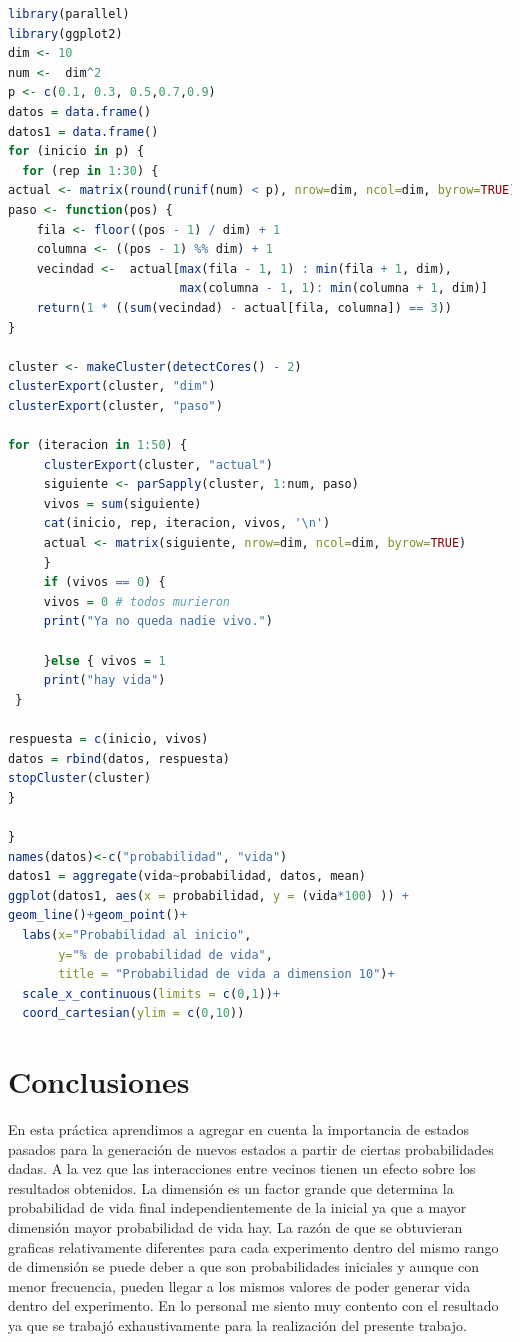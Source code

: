 \documentclass{article}
\begin{document}
\begin{lstlisting}[language=R]
library(parallel)
library(ggplot2)
dim <- 10
num <-  dim^2
p <- c(0.1, 0.3, 0.5,0.7,0.9)
datos = data.frame()
datos1 = data.frame()
for (inicio in p) {
  for (rep in 1:30) {
actual <- matrix(round(runif(num) < p), nrow=dim, ncol=dim, byrow=TRUE)
paso <- function(pos) {
    fila <- floor((pos - 1) / dim) + 1
    columna <- ((pos - 1) %% dim) + 1
    vecindad <-  actual[max(fila - 1, 1) : min(fila + 1, dim),
                        max(columna - 1, 1): min(columna + 1, dim)]
    return(1 * ((sum(vecindad) - actual[fila, columna]) == 3))
}
  
cluster <- makeCluster(detectCores() - 2)
clusterExport(cluster, "dim")
clusterExport(cluster, "paso")

for (iteracion in 1:50) {
     clusterExport(cluster, "actual")
     siguiente <- parSapply(cluster, 1:num, paso)
     vivos = sum(siguiente)
     cat(inicio, rep, iteracion, vivos, '\n')
     actual <- matrix(siguiente, nrow=dim, ncol=dim, byrow=TRUE)
     }
     if (vivos == 0) { 
     vivos = 0 # todos murieron
     print("Ya no queda nadie vivo.")
     
     }else { vivos = 1
     print("hay vida")
 }

respuesta = c(inicio, vivos)
datos = rbind(datos, respuesta) 
stopCluster(cluster)
}

}
names(datos)<-c("probabilidad", "vida")
datos1 = aggregate(vida~probabilidad, datos, mean)
ggplot(datos1, aes(x = probabilidad, y = (vida*100) )) +
geom_line()+geom_point()+
  labs(x="Probabilidad al inicio", 
       y="% de probabilidad de vida", 
       title = "Probabilidad de vida a dimension 10")+
  scale_x_continuous(limits = c(0,1))+
  coord_cartesian(ylim = c(0,10))
\end{lstlisting}

\section{Conclusiones}
En esta práctica aprendimos a agregar en cuenta la importancia de estados pasados para la generación de nuevos estados a partir de ciertas probabilidades dadas. A la vez que las interacciones entre vecinos tienen un efecto sobre los resultados obtenidos. La dimensión es un factor grande que determina la probabilidad de vida final independientemente de la inicial ya que a mayor dimensión mayor probabilidad de vida hay. La razón de que se obtuvieran graficas relativamente diferentes para cada experimento dentro del mismo rango de dimensión se puede deber a que son probabilidades iniciales y aunque con menor frecuencia, pueden llegar a los mismos valores de poder generar vida dentro del experimento. En lo personal me siento muy contento con el resultado ya que se trabajó exhaustivamente para la realización del presente trabajo.



\end{document}
